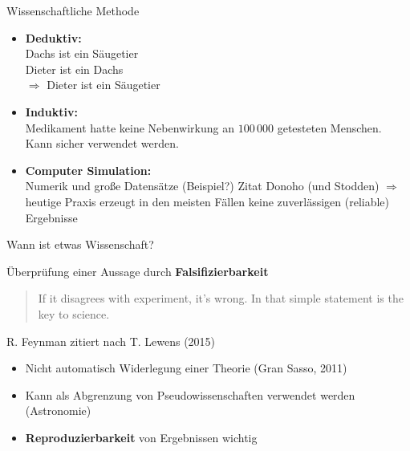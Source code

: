 \documentclass{beamer}
\begin{document}
\begin{frame}{Wissenschaftliche Methode}

    \begin{itemize}
        \item \textbf{Deduktiv:} \\
            \small{Dachs ist ein Säugetier\\%
                   Dieter ist ein Dachs\\%
                   $\Rightarrow$ Dieter ist ein Säugetier}
    \end{itemize}
    \begin{itemize}
        \item \textbf{Induktiv:} \\
            \small{Medikament hatte keine Nebenwirkung an $100\,000$ getesteten
                   Menschen.\\%
                   Kann sicher verwendet werden.}
    \end{itemize}
    \begin{itemize}
        \item \textbf{Computer Simulation:} \\
            \small{Numerik und große Datensätze (Beispiel?)}
            Zitat Donoho (und Stodden)
            $\Rightarrow$ heutige Praxis erzeugt in den meisten Fällen keine
            zuverlässigen (reliable) Ergebnisse

    \end{itemize}

\end{frame}

\begin{frame}{Wann ist etwas Wissenschaft?}

    Überprüfung einer Aussage durch \textbf{Falsifizierbarkeit}
    \begin{quote}
        If it disagrees with experiment, it's wrong. In that simple statement is
        the key to science.
    \end{quote}

    {\ft\hfill R. Feynman zitiert nach T. Lewens (2015)}

    \vspace{1cm}

    \begin{itemize}
        \item Nicht automatisch Widerlegung einer Theorie (Gran Sasso, 2011)
        \item Kann als Abgrenzung von Pseudowissenschaften verwendet werden
            (Astronomie)
        \item \textbf{Reproduzierbarkeit} von Ergebnissen wichtig
    \end{itemize}

\end{frame}
\end{document}

